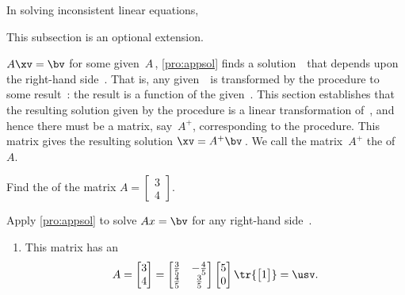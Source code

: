
In solving inconsistent linear equations, 
\begin{aside}
This subsection is an optional extension.
\end{aside}%
\(A\xv=\bv\) for some given~\(A\)\,, \autoref{pro:appsol} finds a solution~\xv\ that depends upon the right-hand side~\bv.
That is, any given~\bv\ is transformed by the procedure to some result~\xv: the result is a function of the given~\bv.
This section establishes that the resulting solution given by the procedure is a linear transformation of~\bv, and hence there must be a matrix, say~\(A^+\), corresponding to the procedure. 
This matrix gives the resulting solution \(\xv=A^+\bv\)\,.
We call the matrix~\(A^+\) the  of~\(A\).

\begin{example} \label{eg:psinv34}
Find the  of the matrix \(A=\begin{bmatrix} 3\\4 \end{bmatrix}\).
\begin{solution} 
Apply \autoref{pro:appsol} to solve \(Ax=\bv\) for any right-hand side~\bv.
\begin{enumerate}
\item This matrix has an \svd\ 
\begin{equation*}
A=\begin{bmatrix} 3\\4 \end{bmatrix}
=\begin{bmatrix} \frac35&-\frac45\\\frac45&\frac35 \end{bmatrix}
\begin{bmatrix} 5\\0 \end{bmatrix}\tr{\begin{bmatrix} 1 \end{bmatrix}}
=\usv.
\end{equation*}


\end{enumerate}
\end{solution}
\end{example}
